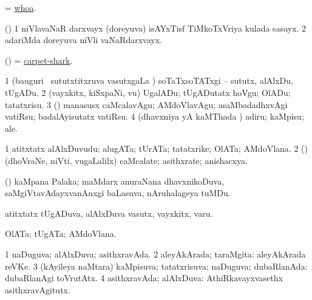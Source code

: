 \bentry
{} 
\gl{\BAavayx}
\expl{}
\bmng
= \hyperlink{whoa}{whoa}. 
\emng
\eentry

\bentry
{} 
\gl{\saMkiSx}
\expl{}
\bmng
{} 
\emng
\eentry

\bentry
{} 
\gl{\nA}
\expl{}
\bmng
(\ca) 
\bnum
\num{1} niVlavaNaR darxvayx (doreyuva) isAYxTisf TiMkoTxVriya kulada sasayx. 
\num{2} adariMda doreyuva niVli vaNaRdarxvayx. 
\enum
\emng
\eentry

\bentry
{} 
\gl{\nA}
\expl{}
\bmng
(\AseTxrXV) = \hyperref{kandict_c.pdf}{C}{carpet-shark}{carpet-shark}. 
\emng
\eentry

\bentry
{} 
\gl{\akirx}
\expl{}
\bmng
\bnum
\num{1} (bauguri \mo\ sututxtitxruva vasutxgaLa \vi) soTaTxsoTATxgi -- sututx, alAlxDu, tUgADu. 
\num{2} (vayxkitx, kiSxpaNi, \mo vu) UgalADu; tUgADutatx hoVgu; OlADu; tatatxrisu. 
\num{3} (\rUpa) manasusx caMcalavAgu; AMdoVlavAgu; asaMbadadhxvAgi vatiRsu; badalAyisutatx vatiRsu. 
\num{4} (dhavxniya yA kaMThada \vi) adiru; kaMpisu; ale. 
\enum
\emng
\eentry

\bentry
{} 
\gl{\nA}
\expl{}
\bmng
\bnum
\num{1} atitxtatx alAlxDuvudu; alugATa; tUrATa; tatatxrike; OlATa; AMdoVlana. 
\num{2} (\rUpa) (dhoVraNe, niVti, \mo vugaLalilx) caMcalate; asithxrate; anishacxya. 
\enum
\emng
\eentry

\bentry
{} 
\gl{\nA}
\expl{}
\bmng
(\AseTxrXV) kaMpana Palaka; maMdarx anuraNana dhavxnikoDuva, saMgiVtavAdayxvanAnxgi baLasuva, nAruhalageya tuMDu. 
\emng
\eentry

\bentry
{} 
\gl{\nA}
\expl{}
\bmng
atitxtatx tUgADuva, alAlxDuva vasutx, vayxkitx, \mo varu. 
\emng
\eentry

\bentry
{} 
\gl{\nA}
\expl{}
\bmng
OlATa; tUgATa; AMdoVlana. 
\emng
\eentry

\bentry
{} 
\gl{\gu}
\bmng
\bnum
\num{1} naDuguva; alAlxDuva; asithxravAda. 
\num{2} aleyAkArada; taraMgita:  aleyAkArada reVKe. 
\num{3} (kAyileya naMtara) kaMpisuva; tatatxrisuva; naDuguva; dubaRlanAda:  dubaRlanAgi toVrutAtx. 
\num{4} asithxravAda; alAlxDuva:  AthiRkavayxvasethx asithxravAgitutx. 
\enum
\emng

